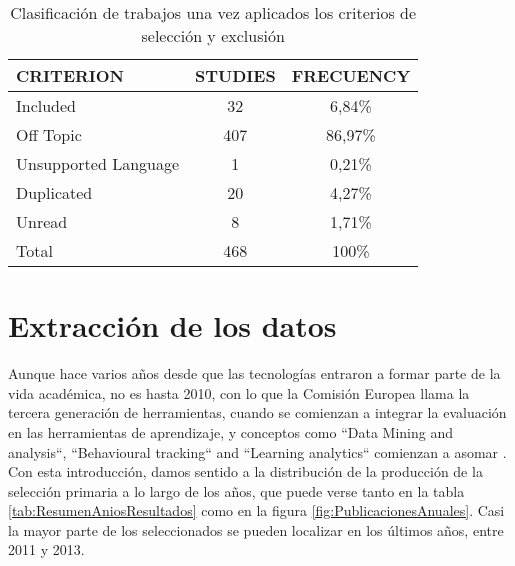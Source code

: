 \begin{table}[H]
  \begin{center}
  \begin{tabular}{| m{4cm} | c | c |}
    \hline
    CRITERION & STUDIES & FRECUENCY\\
    \hline
    \hline 
    Included & 32 & 6,84\% \\
    \hline
    Off Topic & 407 & 86,97\% \\
    \hline
    Unsupported Language & 1 & 0,21\% \\
    \hline
    Duplicated & 20 & 4,27\% \\
    \hline
    Unread & 8 & 1,71\% \\
    \hline
    Total & 468 & 100\% \\
    \hline
  \end{tabular}
\end{center}
\caption{Clasificación de trabajos una vez aplicados los criterios de selección y exclusión}
\label{tab:ResumenSelecccionResultados}
\end{table} 


\section{Extracción de los datos}

Aunque hace varios años desde que las tecnologías entraron a formar parte de la vida académica, no es hasta 2010, con lo que la Comisión Europea llama la tercera generación de herramientas, cuando se comienzan a integrar la evaluación en las herramientas de aprendizaje, y conceptos como ``Data Mining and analysis``, ``Behavioural tracking`` and ``Learning analytics`` comienzan a asomar \cite{Redecker:2013}. Con esta introducción, damos sentido a la distribución de la producción de la selección primaria a lo largo de los años, que puede verse tanto en la tabla \ref{tab:ResumenAniosResultados} como en la figura \ref{fig:PublicacionesAnuales}. Casi la mayor parte de los seleccionados se pueden localizar en los últimos años, entre 2011 y 2013.


